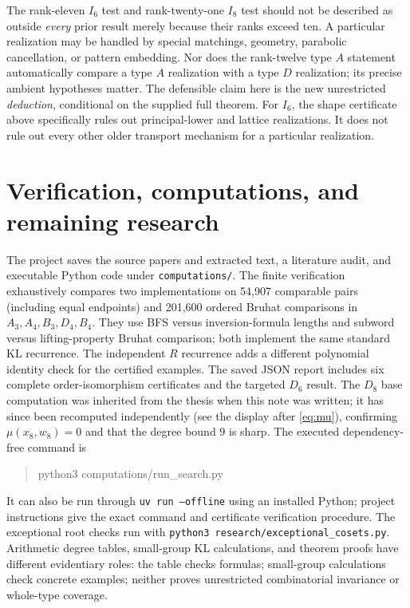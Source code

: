 \documentclass[11pt]{article}
\theoremstyle{definition}\newtheorem{definition}[theorem]{Definition}
\theoremstyle{remark}\newtheorem{remark}[theorem]{Remark}
\begin{document}
The rank-eleven $I_6$ test and rank-twenty-one $I_8$ test should not
be described as outside \emph{every} prior result merely because their
ranks exceed ten. A particular realization may be handled by special
matchings, geometry, parabolic cancellation, or pattern embedding.
Nor does the rank-twelve type $A$ statement automatically compare a
type $A$ realization with a type $D$ realization; its precise ambient
hypotheses matter. The defensible claim here is the new unrestricted
\emph{deduction}, conditional on the supplied full theorem.
For $I_6$, the shape certificate above specifically rules out
principal-lower and lattice realizations. It does not rule out
every other older transport mechanism for a particular realization.

\section{Verification, computations, and remaining research}
The project saves the source papers and extracted text, a literature
audit, and executable Python code under \texttt{computations/}.
The finite verification exhaustively compares two implementations on
54,907 comparable pairs (including equal endpoints) and 201,600
ordered Bruhat comparisons in
$A_3,A_4,B_3,D_4,B_4$. They use BFS versus inversion-formula lengths
and subword versus lifting-property Bruhat comparison; both implement
the same standard KL recurrence. The independent $R$ recurrence adds
a different polynomial identity check for the certified examples.
The saved JSON report includes six complete order-isomorphism
certificates and the targeted $D_6$ result. The $D_8$ base computation
was inherited from the thesis when this note was written; it has since been
recomputed independently (see the display after \eqref{eq:mu}), confirming
$\mu(x_8,w_8)=0$ and that the degree bound $9$ is sharp.
The executed dependency-free command is
\begin{quote}\ttfamily\small
python3 computations/run\_search.py
\end{quote}
It can also be run through \texttt{uv run --offline} using an installed
Python; project instructions give the exact command and certificate
verification procedure. The exceptional root checks run with
\texttt{python3 research/exceptional\_cosets.py}.
Arithmetic degree tables, small-group KL calculations, and theorem
proofs have different evidentiary roles: the table checks formulas;
small-group calculations check concrete examples; neither proves
unrestricted combinatorial invariance or whole-type coverage.
\end{document}

